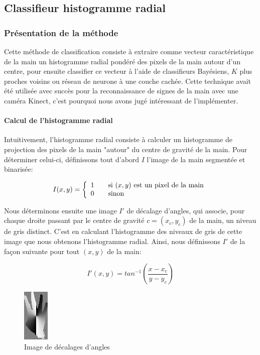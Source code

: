 \subsection{Classifieur histogramme radial}
\subsubsection{Présentation de la méthode}

Cette méthode de classification consiste à extraire comme vecteur caractéristique de la main un histogramme radial pondéré des pixels de la main autour d'un centre, pour ensuite classifier ce vecteur à l'aide de classifieurs Bayésiens, $K$ plus proches voisins ou réseau de neurone à une couche cachée. Cette technique avait été utilisée avec succès pour la reconnaissance de signes de la main avec une caméra Kinect\cite{matthewTang}, c'est pourquoi nous avons jugé intéressant de l'implémenter.

\paragraph{Calcul de l'histogramme radial}
Intuitivement, l'histogramme radial consiste à calculer un histogramme de projection des pixels de la main "autour" du centre de gravité de la main. Pour déterminer celui-ci, définissons tout d'abord $I$ l'image de la main segmentée et binarisée:

\[
I(x,y) = \left\{
  \begin{array}{l l}
    1 & \quad \text{si $(x,y)$ est un pixel de la main}\\
    0 & \quad \text{sinon}
  \end{array} \right.
\]

Nous déterminons ensuite une image $I'$ de décalage d'angles, qui associe, pour chaque droite passant par le centre de gravité $c = (x_c, y_c)$ de la main, un niveau de gris distinct. C'est en calculant l'histogramme des niveaux de gris de cette image que nous obtenons l'histogramme radial. Ainsi, nous définissons $I'$ de la façon suivante pour tout $(x,y)$ de la main:

\[
I'(x,y) = tan^{-1}(\frac{x - x_c}{y - y_c})
\]

\begin{figure}[htb!]
\centerline{\includegraphics{handAngleOffsets.png}}
\caption{Image de décalages d'angles}
\label{fig:decalageAngles}
\end{figure}

